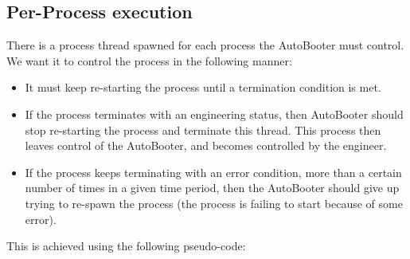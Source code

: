 \documentclass[10pt,a4paper]{article}
\begin{document}
\subsection{Per-Process execution}
\label{sec:perprocessexecution}
There is a process thread spawned for each process the AutoBooter must control. 
We want it to control the process in the following manner:
\begin{itemize}
\item It must keep re-starting the process until a termination condition is met.
\item If the process terminates with an engineering status, then AutoBooter should stop re-starting
	the process and terminate this thread. This process then leaves control of the AutoBooter,
	and becomes controlled by the engineer.
\item If the process keeps terminating with an error condition, more than a certain number of times in a given
	time period, then the AutoBooter should give up trying to re-spawn the process (the process is failing
	to start because of some error).
\end{itemize}
This is achieved using the following pseudo-code:
\end{document}
